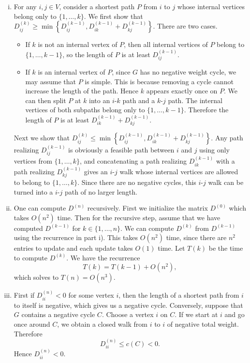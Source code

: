 \documentclass[11pt]{article}
\renewcommand{\leq}{\leqslant}
\renewcommand{\geq}{\geqslant}
\begin{document}
\begin{enumerate}[1)]
\begin{solution}
\begin{enumerate}[i)]
\item
For any \(i,j\in V\), consider a shortest path \(P\) from \(i\) to \(j\) whose internal vertices belong only to
\(\{1,\dots,k\}\). We first show that $D^{(k)}_{ij}
    \geq \min\left\{
      D^{(k-1)}_{ij},
      D^{(k-1)}_{ik}+D^{(k-1)}_{kj}
    \right\}$. There are two cases.
\begin{itemize}
  \item If \(k\) is not an internal vertex of \(P\), then all internal vertices of \(P\) belong to
  \(\{1,\dots,k-1\}\), so the length of \(P\) is at least \(D^{(k-1)}_{ij}\).
  \item If \(k\) is an internal vertex of \(P\), since \(G\) has no negative weight cycle, we may assume that
  \(P\) is simple. This is because removing a cycle cannot increase the length of the path. Hence \(k\) appears exactly once on
  \(P\). We can then split \(P\) at \(k\) into an \(i\)-\(k\) path and a \(k\)-\(j\) path. The internal vertices of both
  subpaths belong only to \(\{1,\dots,k-1\}\). Therefore the length of \(P\) is at least $D^{(k-1)}_{ik}+D^{(k-1)}_{kj}.$
\end{itemize}
Next we show that $D^{(k)}_{ij}
    \leq \min\left\{
      D^{(k-1)}_{ij},
      D^{(k-1)}_{ik}+D^{(k-1)}_{kj}
    \right\}$.
Any path realizing \(D^{(k-1)}_{ij}\) is obviously a feasible path between \(i\) and \(j\) using only vertices from \(\{1,\dots,k\}\), and concatenating a path realizing
\(D^{(k-1)}_{ik}\) with a path realizing \(D^{(k-1)}_{kj}\) gives an \(i\)-\(j\) walk whose internal vertices are allowed to belong to \(\{1,\dots,k\}\). Since there are no negative cycles, this \(i\)-\(j\) walk can be turned into a \(i\)-\(j\) path of no
larger length. 

\item One can compute $D^{(n)}$ recursively. First we initialize the matrix \(D^{(0)}\) which takes \(O(n^2)\) time.
Then for the recursive step, assume that we have computed \(D^{(k-1)}\) for \(k\in\{1,\dots,n\}\). We can compute \(D^{(k)}\) from \(D^{(k-1)}\) using the recurrence in part i). This takes \(O(n^2)\) time, since there are \(n^2\) entries to update and each update takes \(O(1)\) time.
Let $T(k)$ be the time to compute \(D^{(k)}\). We have the recurrence
\[
T(k) = T(k-1) + O(n^2),
\]
which solves to \(T(n)=O(n^3)\).

\item
First if \(D^{(n)}_{ii}<0\) for some vertex \(i\), then the length of a shortest path from \(i\) to itself is negative, which gives us a negative cycle. 
Conversely, suppose that \(G\) contains a negative cycle \(C\). Choose a vertex \(i\) on \(C\). If we start at \(i\)
and go once around \(C\), we obtain a closed walk from \(i\) to \(i\) of negative total weight.
Therefore
\[
D^{(n)}_{ii}\leq c(C)<0.
\]
Hence \(D^{(n)}_{ii}<0\).
\end{enumerate}
\end{solution}


\end{enumerate}
\end{document}
